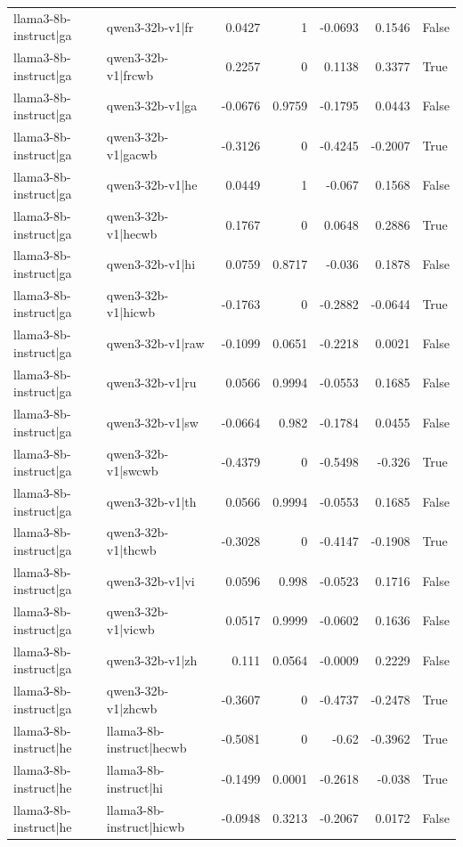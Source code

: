 \begin{table}
\begin{tabular}{l l r r r r l}
llama3-8b-instruct|ga & qwen3-32b-v1|fr & 0.0427 & 1 & -0.0693 & 0.1546 & False \\
llama3-8b-instruct|ga & qwen3-32b-v1|frcwb & 0.2257 & 0 & 0.1138 & 0.3377 & True \\
llama3-8b-instruct|ga & qwen3-32b-v1|ga & -0.0676 & 0.9759 & -0.1795 & 0.0443 & False \\
llama3-8b-instruct|ga & qwen3-32b-v1|gacwb & -0.3126 & 0 & -0.4245 & -0.2007 & True \\
llama3-8b-instruct|ga & qwen3-32b-v1|he & 0.0449 & 1 & -0.067 & 0.1568 & False \\
llama3-8b-instruct|ga & qwen3-32b-v1|hecwb & 0.1767 & 0 & 0.0648 & 0.2886 & True \\
llama3-8b-instruct|ga & qwen3-32b-v1|hi & 0.0759 & 0.8717 & -0.036 & 0.1878 & False \\
llama3-8b-instruct|ga & qwen3-32b-v1|hicwb & -0.1763 & 0 & -0.2882 & -0.0644 & True \\
llama3-8b-instruct|ga & qwen3-32b-v1|raw & -0.1099 & 0.0651 & -0.2218 & 0.0021 & False \\
llama3-8b-instruct|ga & qwen3-32b-v1|ru & 0.0566 & 0.9994 & -0.0553 & 0.1685 & False \\
llama3-8b-instruct|ga & qwen3-32b-v1|sw & -0.0664 & 0.982 & -0.1784 & 0.0455 & False \\
llama3-8b-instruct|ga & qwen3-32b-v1|swcwb & -0.4379 & 0 & -0.5498 & -0.326 & True \\
llama3-8b-instruct|ga & qwen3-32b-v1|th & 0.0566 & 0.9994 & -0.0553 & 0.1685 & False \\
llama3-8b-instruct|ga & qwen3-32b-v1|thcwb & -0.3028 & 0 & -0.4147 & -0.1908 & True \\
llama3-8b-instruct|ga & qwen3-32b-v1|vi & 0.0596 & 0.998 & -0.0523 & 0.1716 & False \\
llama3-8b-instruct|ga & qwen3-32b-v1|vicwb & 0.0517 & 0.9999 & -0.0602 & 0.1636 & False \\
llama3-8b-instruct|ga & qwen3-32b-v1|zh & 0.111 & 0.0564 & -0.0009 & 0.2229 & False \\
llama3-8b-instruct|ga & qwen3-32b-v1|zhcwb & -0.3607 & 0 & -0.4737 & -0.2478 & True \\
llama3-8b-instruct|he & llama3-8b-instruct|hecwb & -0.5081 & 0 & -0.62 & -0.3962 & True \\
llama3-8b-instruct|he & llama3-8b-instruct|hi & -0.1499 & 0.0001 & -0.2618 & -0.038 & True \\
llama3-8b-instruct|he & llama3-8b-instruct|hicwb & -0.0948 & 0.3213 & -0.2067 & 0.0172 & False \\

\end{tabular}
\end{table}
